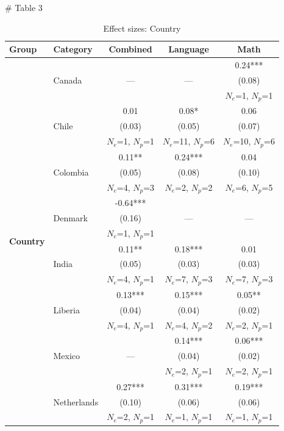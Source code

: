 # Table 3

\renewcommand{\arraystretch}{0.9} %
\begin{table}[htbp]
\centering
\caption{Effect sizes: Country}
\small %
\setlength{\tabcolsep}{5pt} %
\medskip
\begin{tabular*}{\linewidth}{@{\extracolsep{\fill}} l l c c c @{}}
\toprule
\textbf{Group} & \textbf{Category} & \textbf{Combined} & \textbf{Language} & \textbf{Math} \\
\midrule
\multirow{51}{*}{\textbf{Country}}
  &  &  &  & 0.24*** \\
  & Canada & --- & --- & (0.08) \\
  &  &  &  & $N_e$=1, $N_p$=1 \\
\cmidrule(lr){2-5}
  &  & 0.01 & 0.08* & 0.06 \\
  & Chile & (0.03) & (0.05) & (0.07) \\
  &  & $N_e$=1, $N_p$=1 & $N_e$=11, $N_p$=6 & $N_e$=10, $N_p$=6 \\
\cmidrule(lr){2-5}
  &  & 0.11** & 0.24*** & 0.04 \\
  & Colombia & (0.05) & (0.08) & (0.10) \\
  &  & $N_e$=4, $N_p$=3 & $N_e$=2, $N_p$=2 & $N_e$=6, $N_p$=5 \\
\cmidrule(lr){2-5}
  &  & -0.64*** &  &  \\
  & Denmark & (0.16) & --- & --- \\
  &  & $N_e$=1, $N_p$=1 &  &  \\
\cmidrule(lr){2-5}
  &  & 0.11** & 0.18*** & 0.01 \\
  & India & (0.05) & (0.03) & (0.03) \\
  &  & $N_e$=4, $N_p$=1 & $N_e$=7, $N_p$=3 & $N_e$=7, $N_p$=3 \\
\cmidrule(lr){2-5}
  &  & 0.13*** & 0.15*** & 0.05** \\
  & Liberia & (0.04) & (0.04) & (0.02) \\
  &  & $N_e$=4, $N_p$=1 & $N_e$=4, $N_p$=2 & $N_e$=2, $N_p$=1 \\
\cmidrule(lr){2-5}
  &  &  & 0.14*** & 0.06*** \\
  & Mexico & --- & (0.04) & (0.02) \\
  &  &  & $N_e$=2, $N_p$=1 & $N_e$=2, $N_p$=1 \\
\cmidrule(lr){2-5}
  &  & 0.27*** & 0.31*** & 0.19*** \\
  & Netherlands & (0.10) & (0.06) & (0.06) \\
  &  & $N_e$=2, $N_p$=1 & $N_e$=1, $N_p$=1 & $N_e$=1, $N_p$=1 \\

\end{tabular*}
\end{table}
